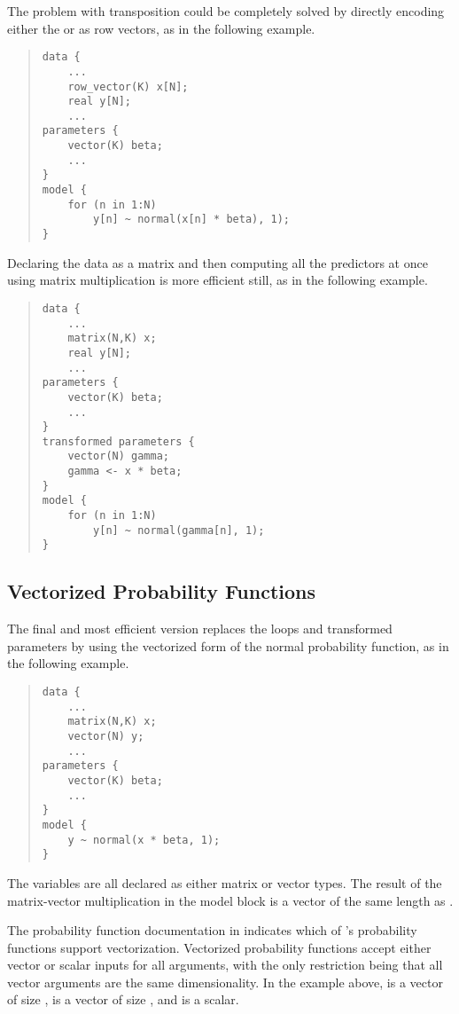 %
The problem with transposition could be completely solved by directly
encoding either the  or  as row vectors, as in the
following example.
%
\begin{quote}
\begin{Verbatim} 
data {
    ...
    row_vector(K) x[N];
    real y[N];
    ...
parameters {
    vector(K) beta;
    ...
}
model {
    for (n in 1:N)
        y[n] ~ normal(x[n] * beta), 1);
}
\end{Verbatim}
\end{quote}
%
Declaring the data as a matrix and then computing all the predictors
at once using matrix multiplication is more efficient still, as in the
following example.
%
\begin{quote}
\begin{Verbatim}  
data {
    ...
    matrix(N,K) x;
    real y[N];
    ... 
parameters {
    vector(K) beta;
    ...
} 
transformed parameters {
    vector(N) gamma;
    gamma <- x * beta;
} 
model {
    for (n in 1:N)
        y[n] ~ normal(gamma[n], 1);
}
\end{Verbatim}
\end{quote}

\subsection{Vectorized Probability Functions}
The final and most efficient version replaces the loops and
transformed parameters by using the vectorized form of the normal
probability function, as in the following example.
%
\begin{quote}
\begin{Verbatim} 
data {
    ...
    matrix(N,K) x;
    vector(N) y;
    ...
parameters {
    vector(K) beta;
    ...
}
model {
    y ~ normal(x * beta, 1);
}
\end{Verbatim}
\end{quote}
%
The variables are all declared as either matrix or vector types.
The result of the matrix-vector multiplication  in the
model block is a vector of the same length as .  

The probability function documentation in  indicates which
of \Stan's probability functions support vectorization.  Vectorized
probability functions accept either vector or scalar inputs for all
arguments, with the only restriction being that all vector arguments
are the same dimensionality.  In the example above,  is a
vector of size ,  is a vector of size ,
and  is a scalar.

